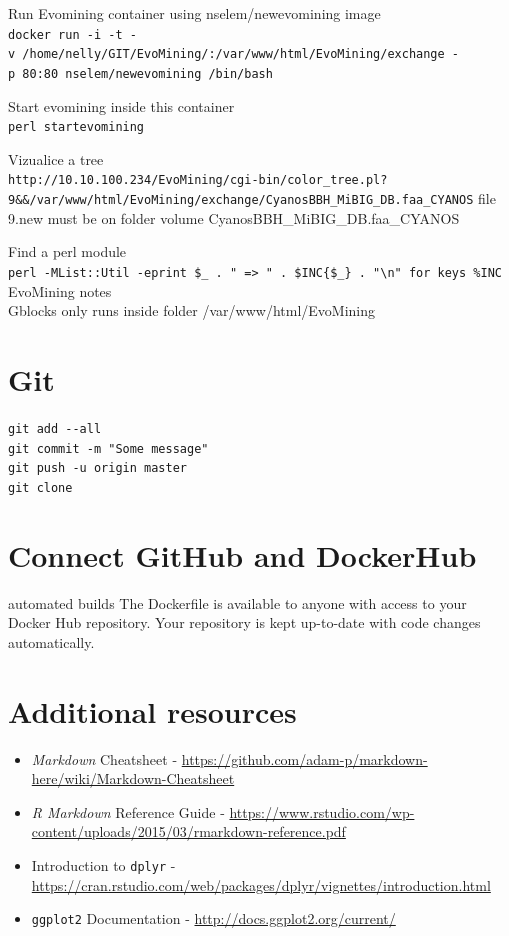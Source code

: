 \documentclass[12pt,twoside]{reedthesis}
\begin{document}
  Run Evomining container using nselem/newevomining image\\
  \texttt{docker\ run\ -i\ -t\ -v\ /home/nelly/GIT/EvoMining/:/var/www/html/EvoMining/exchange\ -p\ 80:80\ nselem/newevomining\ /bin/bash}
  
  Start evomining inside this container\\
  \texttt{perl\ startevomining}
  
  Vizualice a tree\\
  \texttt{http://10.10.100.234/EvoMining/cgi-bin/color\_tree.pl?9\&\&/var/www/html/EvoMining/exchange/CyanosBBH\_MiBIG\_DB.faa\_CYANOS}
  file 9.new must be on folder volume CyanosBBH\_MiBIG\_DB.faa\_CYANOS
  
  Find a perl module\\
  \texttt{perl\ -MList::Util\ -e\textquotesingle{}print\ \$\_\ .\ "\ =\textgreater{}\ "\ .\ \$INC\{\$\_\}\ .\ "\textbackslash{}n"\ for\ keys\ \%INC\textquotesingle{}}
  EvoMining notes\\
  Gblocks only runs inside folder /var/www/html/EvoMining
  
  \section{Git}\label{git}
  
  \texttt{git\ add\ -\/-all}\\
  \texttt{git\ commit\ -m\ "Some\ message"}\\
  \texttt{git\ push\ -u\ origin\ master}\\
  \texttt{git\ clone}
  
  \section{Connect GitHub and
  DockerHub}\label{connect-github-and-dockerhub}
  
  automated builds The Dockerfile is available to anyone with access to
  your Docker Hub repository. Your repository is kept up-to-date with code
  changes automatically.
  
  \section{Additional resources}\label{additional-resources}
  
  \begin{itemize}
  \item
    \emph{Markdown} Cheatsheet -
    \url{https://github.com/adam-p/markdown-here/wiki/Markdown-Cheatsheet}
  \item
    \emph{R Markdown} Reference Guide -
    \url{https://www.rstudio.com/wp-content/uploads/2015/03/rmarkdown-reference.pdf}
  \item
    Introduction to \texttt{dplyr} -
    \url{https://cran.rstudio.com/web/packages/dplyr/vignettes/introduction.html}
  \item
    \texttt{ggplot2} Documentation -
    \url{http://docs.ggplot2.org/current/}
  \end{itemize}
  
\end{document}
